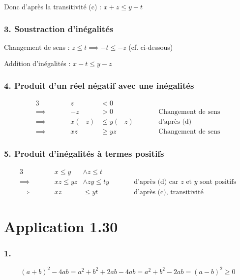 \documentclass{report}
\begin{document}
Donc d'après la transitivité (c) : $ x  + z \leq y + t$ 

\subsubsection*{3. Soustraction d'inégalités}
 
Changement de sens : $z \leq t \implies -t \leq -z$ (cf. ci-dessous)

Addition d'inégalités : $x - t \leq y - z$ 

\subsubsection*{4. Produit d'un réel négatif avec une inégalités}

\begin{alignat*}{3}
	        &         &     z &< 0 \\
	\implies& \qquad  &    -z &> 0        &\qquad& \text{Changement de sens}\\
	\implies&         & x(-z) &\leq y(-z) &      & \text{d'après (d)}\\
	\implies&         &    xz &\geq yz    &      & \text{Changement de sens}
\end{alignat*}

\subsubsection*{5. Produit d'inégalités à termes positifs}

\begin{alignat*}{3}
	        &\qquad &  x \leq y  &\wedge z\leq t\\
	\implies&       & xz \leq yz &\wedge zy \leq ty &\qquad &\text{d'après (d) car $z$ et $y$ sont positifs} \\
	\implies&       &         xz &\leq yt           &       &\text{d'après (c), transitivité}
\end{alignat*}

\section*{Application 1.30}
\subsubsection*{1.}

\[(a+b)^2 - 4ab = a^2 + b^2 + 2ab - 4 ab = a^2 + b^2 - 2ab = (a-b)^2 \ge 0\]
\end{document}
